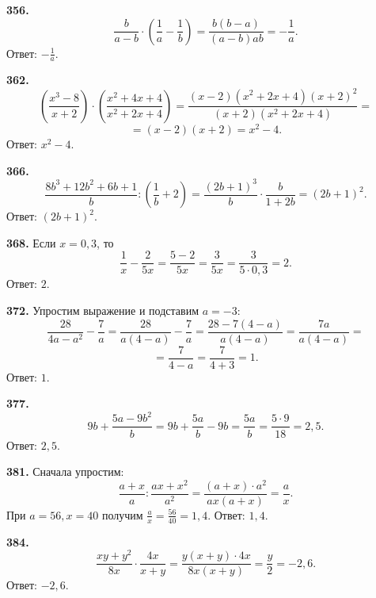 \textbf{356.} $$\frac{b}{a-b}\cdot\left(\frac{1}{a}-\frac{1}{b}\right)=\frac{b\left(b-a\right)}{\left(a-b\right)ab}=-\frac{1}{a}.$$ \newline \null \hspace*{\fill} Ответ: $-\frac{1}{a}$. 

\textbf{362.} $$\left(\frac{x^3-8}{x+2}\right)\cdot\left(\frac{x^2+4x+4}{x^2+2x+4}\right)=\frac{\left(x-2\right)\left(x^2+2x+4\right)\left(x+2\right)^2}{\left(x+2\right)\left(x^2+2x+4\right)}=$$ $$=\left(x-2\right)\left(x+2\right)=x^2-4.$$ \newline \null \hspace*{\fill} Ответ: $x^2-4$. 

\textbf{366.} $$\frac{8b^3+12b^2+6b+1}{b}:\left(\frac{1}{b}+2\right)=\frac{\left(2b+1\right)^3}{b}\cdot\frac{b}{1+2b}=\left(2b+1\right)^2.$$ \newline \null \hspace*{\fill} Ответ: $\left(2b+1\right)^2$.

\textbf{368.} Если $x=0,3$, то $$\frac{1}{x}-\frac{2}{5x}=\frac{5-2}{5x}=\frac{3}{5x}=\frac{3}{5\cdot0,3}=2.$$ \newline \null \hspace*{\fill} Ответ: $2$. 

\textbf{372.}  Упростим выражение и подставим $a=-3$: $$\frac{28}{4a-a^2}-\frac{7}{a}=\frac{28}{a\left(4-a\right)}-\frac{7}{a}=\frac{28-7\left(4-a\right)}{a\left(4-a\right)}=\frac{7a}{a\left(4-a\right)}=$$ $$=\frac{7}{4-a}=\frac{7}{4+3}=1.$$ \newline \null \hspace*{\fill} Ответ: $1$.

\textbf{377.} $$9b+\frac{5a-9b^2}{b}=9b+\frac{5a}{b}-9b=\frac{5a}{b}=\frac{5\cdot9}{18}=2,5.$$ \newline \null \hspace*{\fill} Ответ: $2,5$.

\textbf{381.} Сначала упростим: $$\frac{a+x}{a}:\frac{ax+x^2}{a^2}=\frac{\left(a+x\right)\cdot a^2}{ax\left(a+x\right)}=\frac{a}{x}.$$ При $a=56,x=40$ получим $\frac{a}{x}=\frac{56}{40}=1,4$. \newline \null \hspace*{\fill} Ответ: $1,4$.

\textbf{384.} $$\frac{xy+y^2}{8x}\cdot\frac{4x}{x+y}=\frac{y\left(x+y\right)\cdot4x}{8x\left(x+y\right)}=\frac{y}{2}=-2,6.$$ \newline \null \hspace*{\fill} Ответ: $-2,6$. 

